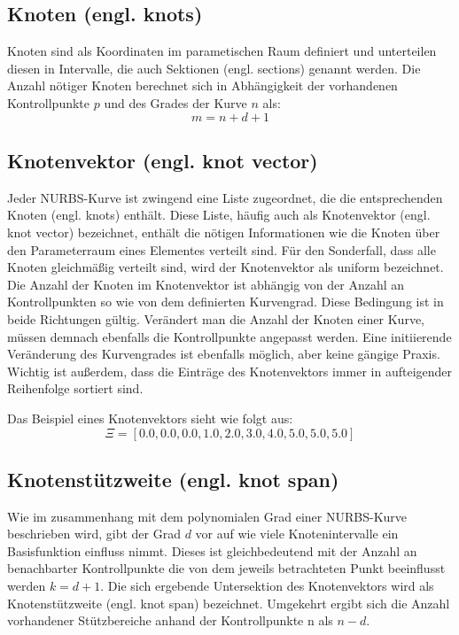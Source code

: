 \documentclass[german,a4paper,12pt,oneside]{scrbook}
\theoremstyle{definition}
\theoremstyle{definition}
\theoremstyle{definition}
\theoremstyle{definition}
\theoremstyle{definition}
\theoremstyle{definition}
\begin{document}
\subsection{Knoten (engl. knots)}
Knoten sind als Koordinaten im parametischen Raum definiert und unterteilen diesen in Intervalle, die auch Sektionen (engl. sections) genannt werden. Die Anzahl nötiger Knoten berechnet sich in Abhängigkeit der vorhandenen Kontrollpunkte $p$ und des Grades der Kurve $n$ als: 
\begin{equation*}
        m = n + d + 1
\end{equation*}


\subsection{Knotenvektor (engl. knot vector)}
Jeder NURBS-Kurve ist zwingend eine Liste zugeordnet, die die entsprechenden Knoten (engl. knots) enthält. Diese Liste, häufig auch als Knotenvektor (engl. knot vector) bezeichnet, enthält die nötigen Informationen wie die Knoten über den Parameterraum eines Elementes verteilt sind. Für den Sonderfall, dass alle Knoten gleichmäßig verteilt sind, wird der Knotenvektor als uniform bezeichnet.  Die Anzahl der Knoten im Knotenvektor ist abhängig von der Anzahl an Kontrollpunkten so wie von dem definierten Kurvengrad. Diese Bedingung ist in beide Richtungen gültig. Verändert man die Anzahl der Knoten einer Kurve, müssen demnach ebenfalls die Kontrollpunkte angepasst werden. Eine initiierende Veränderung des Kurvengrades ist ebenfalls möglich, aber keine gängige Praxis. Wichtig ist außerdem, dass die Einträge des Knotenvektors immer in aufteigender Reihenfolge sortiert sind. 

Das Beispiel eines Knotenvektors sieht wie folgt aus:
\begin{equation*}
    \Xi = [0.0, 0.0, 0.0, 1.0, 2.0, 3.0, 4.0, 5.0, 5.0, 5.0]
\end{equation*}

\subsection{Knotenstützweite (engl. knot span)}
Wie im zusammenhang mit dem polynomialen Grad einer NURBS-Kurve beschrieben wird, gibt der Grad $d$ vor auf wie viele Knotenintervalle ein Basisfunktion einfluss nimmt. Dieses ist gleichbedeutend mit der Anzahl an benachbarter Kontrollpunkte die von dem jeweils betrachteten Punkt beeinflusst werden $k = d + 1$. Die sich ergebende Untersektion des Knotenvektors wird als Knotenstützweite (engl. knot span) bezeichnet. Umgekehrt ergibt sich die Anzahl vorhandener Stützbereiche anhand der Kontrollpunkte n als $n - d$.
\end{document}
